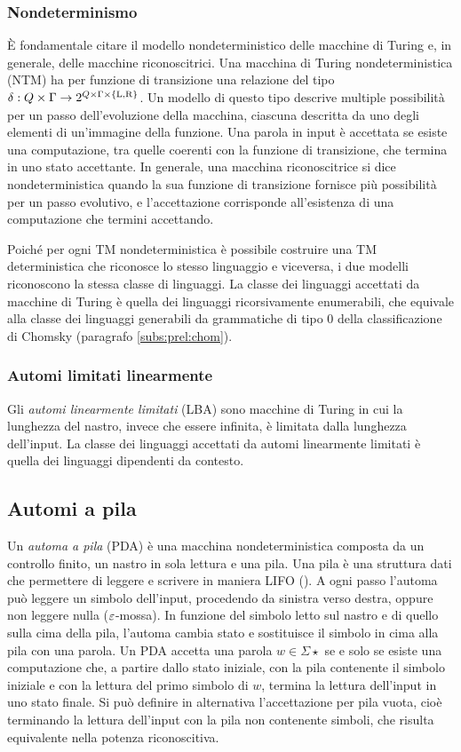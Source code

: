\subsubsection{Nondeterminismo}
È fondamentale citare il modello nondeterministico delle macchine di Turing e, in generale, delle macchine riconoscitrici. Una macchina di Turing nondeterministica (NTM) ha per funzione di transizione una relazione del tipo $\delta:Q\times\Gamma\to 2^{Q\times\Gamma\times\left\{ \mathrm L,\mathrm R \right\}}$. Un modello di questo tipo descrive multiple possibilità per un passo dell'evoluzione della macchina, ciascuna descritta da uno degli elementi di un'immagine della funzione. Una parola in input è accettata se esiste una computazione, tra quelle coerenti con la funzione di transizione, che termina in uno stato accettante.
In generale, una macchina riconoscitrice si dice nondeterministica quando la sua funzione di transizione fornisce più possibilità per un passo evolutivo, e l'accettazione corrisponde all'esistenza di una computazione che termini accettando.

Poiché per ogni TM nondeterministica è possibile costruire una TM deterministica che riconosce lo stesso linguaggio e viceversa, i due modelli riconoscono la stessa classe di linguaggi. La classe dei linguaggi accettati da macchine di Turing è quella dei linguaggi ricorsivamente enumerabili, che equivale alla classe dei linguaggi generabili da grammatiche di tipo 0 della classificazione di Chomsky (paragrafo \ref{subs:prel:chom}).

\subsubsection{Automi limitati linearmente}
Gli \emph{automi linearmente limitati} (LBA) sono macchine di Turing in cui la lunghezza del nastro, invece che essere infinita, è limitata dalla lunghezza dell'input. La classe dei linguaggi accettati da automi linearmente limitati è quella dei linguaggi dipendenti da contesto.


\subsection{Automi a pila}\label{subs:prel:PDA}
Un \emph{automa a pila} (PDA) è una macchina nondeterministica composta da un controllo finito, un nastro in sola lettura e una pila. Una pila è una struttura dati che permettere di leggere e scrivere in maniera LIFO (). A ogni passo l'automa può leggere un simbolo dell'input, procedendo da sinistra verso destra, oppure non leggere nulla ($\varepsilon$-mossa). In funzione del simbolo letto sul nastro e di quello sulla cima della pila, l'automa cambia stato e sostituisce il simbolo in cima alla pila con una parola. Un PDA accetta una parola $w\in\Sigma\star$ se e solo se esiste una computazione che, a partire dallo stato iniziale, con la pila contenente il simbolo iniziale e con la lettura del primo simbolo di $w$, termina la lettura dell'input in uno stato finale. Si può definire in alternativa l'accettazione per pila vuota, cioè terminando la lettura dell'input con la pila non contenente simboli, che risulta equivalente nella potenza riconoscitiva.

